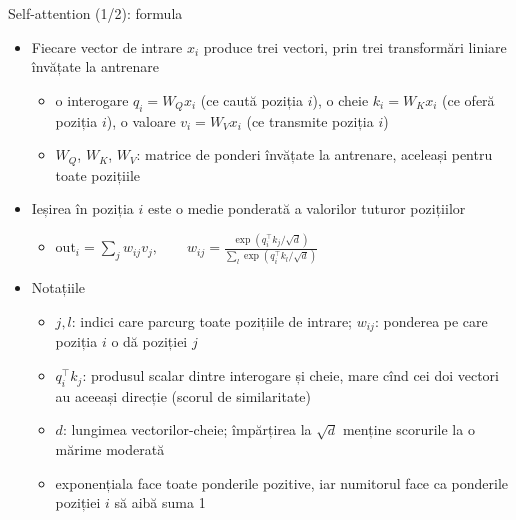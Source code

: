 \begin{frame}{Self-attention (1/2): formula}
\itemsize{\footnotesize}
\begin{itemize}
    \item Fiecare vector de intrare $x_i$ produce trei vectori, prin trei transformări liniare învățate la antrenare
    \begin{itemize}
        \item o interogare $q_i = W_Q x_i$ (ce caută poziția $i$), o cheie $k_i = W_K x_i$ (ce oferă poziția $i$), o valoare $v_i = W_V x_i$ (ce transmite poziția $i$)
        \item $W_Q$, $W_K$, $W_V$: matrice de ponderi învățate la antrenare, aceleași pentru toate pozițiile
    \end{itemize}
    \item Ieșirea în poziția $i$ este o medie ponderată a valorilor tuturor pozițiilor
    \begin{itemize}
        \item $\displaystyle \text{out}_i = \sum_j w_{ij} v_j, \qquad w_{ij} = \frac{\exp(q_i^\top k_j/\sqrt{d})}{\sum_l \exp(q_i^\top k_l/\sqrt{d})}$
    \end{itemize}
    \item Notațiile
    \begin{itemize}
        \item $j, l$: indici care parcurg toate pozițiile de intrare; $w_{ij}$: ponderea pe care poziția $i$ o dă poziției $j$
        \item $q_i^\top k_j$: produsul scalar dintre interogare și cheie, mare cînd cei doi vectori au aceeași direcție (scorul de similaritate)
        \item $d$: lungimea vectorilor-cheie; împărțirea la $\sqrt{d}$ menține scorurile la o mărime moderată
        \item exponențiala face toate ponderile pozitive, iar numitorul face ca ponderile poziției $i$ să aibă suma 1
    \end{itemize}
\end{itemize}
\end{frame}

